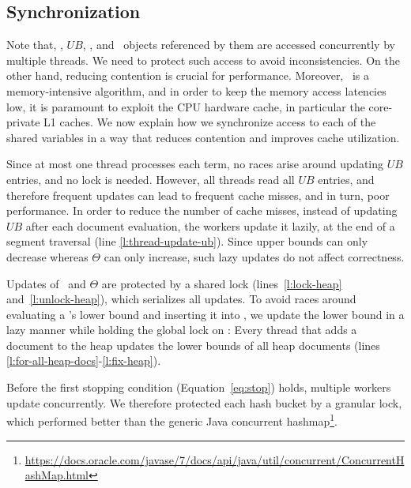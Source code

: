 \subsection{Synchronization} 
\label{sec:synch}

Note that, \DHeap, $UB$, \DMap, and \Docobj\ objects referenced by them are accessed concurrently by multiple threads. We need to protect such access to avoid inconsistencies. On the other hand, reducing contention is crucial for performance. Moreover, 
\alg\ is a memory-intensive algorithm, and 
in order to keep the memory access latencies low, it is paramount to exploit the CPU hardware cache, in particular the core-private L1 caches. 
We now explain how we synchronize access to each of the shared variables
in a way that reduces contention and improves cache utilization. 



Since at most one thread processes each term, no races arise around updating $UB$ entries, and no lock is needed. However, 
all threads read all $UB$ entries, and therefore frequent updates can lead to frequent cache misses, and in turn, poor performance. 
In order to reduce the number of cache misses, instead of updating $UB$ after each document evaluation, the workers update it lazily, at the end of a segment traversal (line \ref{l:thread-update-ub}). Since upper bounds can only decrease whereas $\Theta$ can only increase, such lazy updates do not affect correctness.

Updates of \DHeap\ and $\Theta$ are protected by a shared lock (lines~\ref{l:lock-heap} and~\ref{l:unlock-heap}), which  serializes all updates. 
To avoid races around evaluating a \Docobj's
lower bound and inserting it into \DHeap, we update the lower bound in a lazy manner while holding the global lock on \DHeap: Every thread that adds a document to the heap updates the lower bounds of all heap documents (lines \ref{l:for-all-heap-docs}-\ref{l:fix-heap}).

Before the first stopping condition (Equation~\ref{eq:stop}) holds, multiple workers update \DMap\/ concurrently. 
We therefore protected each hash bucket by a granular lock, which  
performed better than the generic Java concurrent hashmap\footnote{\small{\url{https://docs.oracle.com/javase/7/docs/api/java/util/concurrent/ConcurrentHashMap.html}}}.

